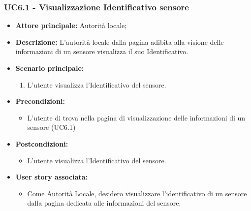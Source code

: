 \subsubsection{UC6.1 - Visualizzazione Identificativo sensore}
\begin{itemize}
    \item \textbf{Attore principale:} Autorità locale;
    \item \textbf{Descrizione:} L’autorità locale dalla pagina adibita alla visione delle informazioni di un sensore visualizza il suo Identificativo.
    \item \textbf{Scenario principale:}
          \begin{enumerate}
              \item L'utente visualizza l'Identificativo del sensore.
          \end{enumerate}
    \item \textbf{Precondizioni:}
          \begin{itemize}
              \item  L'utente di trova nella pagina di visualizzazione delle informazioni di un sensore (UC6.1)
          \end{itemize}
    \item \textbf{Postcondizioni:}
          \begin{itemize}
              \item  L'utente visualizza l'Identificativo del sensore.
          \end{itemize}\item \textbf{User story associata:}
          \begin{itemize}
              \item Come Autorità Locale, desidero visualizzare l'identificativo di un sensore dalla pagina dedicata alle informazioni del sensore.
          \end{itemize}
\end{itemize}